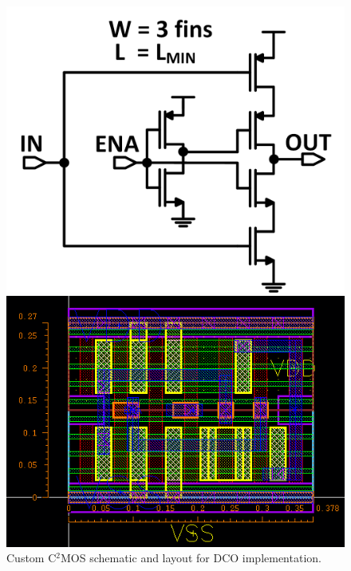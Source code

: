 \documentclass[twoside,9pt,journal,letterpage]{IEEEtran}
\begin{document}
\begin{figure}[h]
	\centering
	\begin{minipage}{0.49\columnwidth}
	\includegraphics[width=\textwidth]{fig_c2mossch}
	\end{minipage}
	\hfill
	\begin{minipage}{0.49\columnwidth}
	\includegraphics[width=\textwidth]{fig_c2moslayout}
	\end{minipage}
	\caption{Custom C$^2$MOS schematic and layout for DCO implementation.}
	\label{fig:c2mos}
\end{figure}
\end{document}
